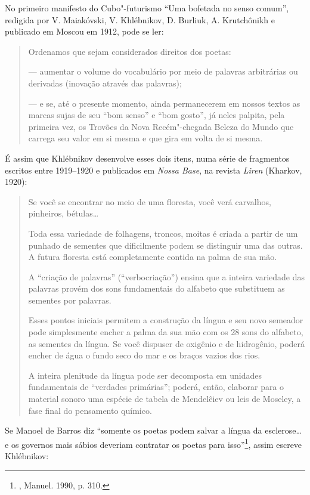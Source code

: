 No primeiro manifesto do Cubo"-futurismo ``Uma bofetada no senso comum'',
redigida por V. Maiakóvski, V. Khlébnikov, D. Burliuk, A. Krutchônikh e
publicado em Moscou em 1912, pode se ler:

\begin{quote}
\noindent{}Ordenamos que sejam considerados direitos dos poetas:

\noindent{} --- aumentar o volume do vocabulário por meio de palavras arbitrárias
ou derivadas (inovação através das palavras);

\noindent{} --- e se, até o presente momento, ainda permanecerem em nossos textos
as marcas sujas de seu ``bom senso'' e ``bom gosto'', já neles palpita,
pela primeira vez, os Trovões da Nova Recém"-chegada Beleza do Mundo que
carrega seu valor em si mesma e que gira em volta de si mesma.
\end{quote}

É assim que Khlébnikov desenvolve esses dois itens, numa série de
fragmentos escritos entre 1919--1920 e publicados em \emph{Nossa Base},
na revista \emph{Liren} (Kharkov, 1920):

\begin{quote}
Se você se encontrar no meio de uma floresta, você verá carvalhos,
pinheiros, bétulas\ldots{}

Toda essa variedade de folhagens, troncos, moitas é criada a partir de
um punhado de sementes que dificilmente podem se distinguir uma das
outras. A futura floresta está completamente contida na palma de sua
mão.

A ``criação de palavras'' (``verbocriação'') ensina que a inteira
variedade das palavras provém dos sons fundamentais do alfabeto que
substituem as sementes por palavras.

Esses pontos iniciais permitem a construção da língua e seu novo
semeador pode simplesmente encher a palma da sua mão com os 28 sons do
alfabeto, as sementes da língua. Se você dispuser de oxigênio e de
hidrogênio, poderá encher de água o fundo seco do mar e os braços vazios
dos rios.

A inteira plenitude da língua pode ser decomposta em unidades
fundamentais de ``verdades primárias''; poderá, então, elaborar para o
material sonoro uma espécie de tabela de Mendelêiev ou leis de Moseley,
a fase final do pensamento químico.
\end{quote}

Se Manoel de Barros diz ``somente os poetas podem salvar a língua da
esclerose\ldots{} e os governos mais sábios deveriam contratar os poetas para
isso''\footnote{, Manuel. 1990, p. 310.}, assim escreve
Khlébnikov:

